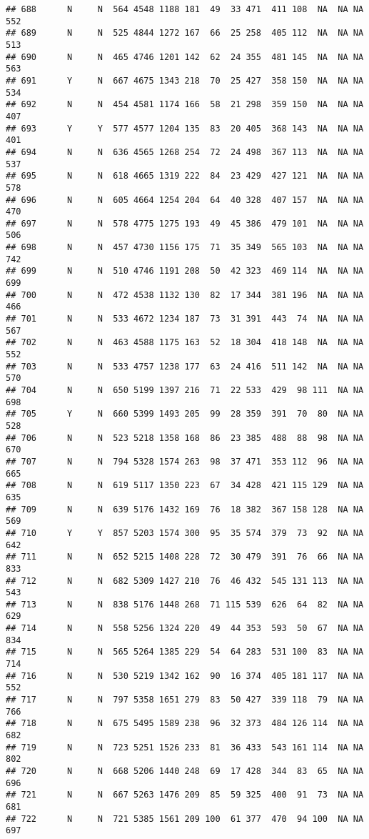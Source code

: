 \documentclass[]{article}
\begin{document}
\begin{verbatim}
## 688      N     N  564 4548 1188 181  49  33 471  411 108  NA  NA NA  552
## 689      N     N  525 4844 1272 167  66  25 258  405 112  NA  NA NA  513
## 690      N     N  465 4746 1201 142  62  24 355  481 145  NA  NA NA  563
## 691      Y     N  667 4675 1343 218  70  25 427  358 150  NA  NA NA  534
## 692      N     N  454 4581 1174 166  58  21 298  359 150  NA  NA NA  407
## 693      Y     Y  577 4577 1204 135  83  20 405  368 143  NA  NA NA  401
## 694      N     N  636 4565 1268 254  72  24 498  367 113  NA  NA NA  537
## 695      N     N  618 4665 1319 222  84  23 429  427 121  NA  NA NA  578
## 696      N     N  605 4664 1254 204  64  40 328  407 157  NA  NA NA  470
## 697      N     N  578 4775 1275 193  49  45 386  479 101  NA  NA NA  506
## 698      N     N  457 4730 1156 175  71  35 349  565 103  NA  NA NA  742
## 699      N     N  510 4746 1191 208  50  42 323  469 114  NA  NA NA  699
## 700      N     N  472 4538 1132 130  82  17 344  381 196  NA  NA NA  466
## 701      N     N  533 4672 1234 187  73  31 391  443  74  NA  NA NA  567
## 702      N     N  463 4588 1175 163  52  18 304  418 148  NA  NA NA  552
## 703      N     N  533 4757 1238 177  63  24 416  511 142  NA  NA NA  570
## 704      N     N  650 5199 1397 216  71  22 533  429  98 111  NA NA  698
## 705      Y     N  660 5399 1493 205  99  28 359  391  70  80  NA NA  528
## 706      N     N  523 5218 1358 168  86  23 385  488  88  98  NA NA  670
## 707      N     N  794 5328 1574 263  98  37 471  353 112  96  NA NA  665
## 708      N     N  619 5117 1350 223  67  34 428  421 115 129  NA NA  635
## 709      N     N  639 5176 1432 169  76  18 382  367 158 128  NA NA  569
## 710      Y     Y  857 5203 1574 300  95  35 574  379  73  92  NA NA  642
## 711      N     N  652 5215 1408 228  72  30 479  391  76  66  NA NA  833
## 712      N     N  682 5309 1427 210  76  46 432  545 131 113  NA NA  543
## 713      N     N  838 5176 1448 268  71 115 539  626  64  82  NA NA  629
## 714      N     N  558 5256 1324 220  49  44 353  593  50  67  NA NA  834
## 715      N     N  565 5264 1385 229  54  64 283  531 100  83  NA NA  714
## 716      N     N  530 5219 1342 162  90  16 374  405 181 117  NA NA  552
## 717      N     N  797 5358 1651 279  83  50 427  339 118  79  NA NA  766
## 718      N     N  675 5495 1589 238  96  32 373  484 126 114  NA NA  682
## 719      N     N  723 5251 1526 233  81  36 433  543 161 114  NA NA  802
## 720      N     N  668 5206 1440 248  69  17 428  344  83  65  NA NA  696
## 721      N     N  667 5263 1476 209  85  59 325  400  91  73  NA NA  681
## 722      N     N  721 5385 1561 209 100  61 377  470  94 100  NA NA  697

\end{verbatim}
\end{document}
